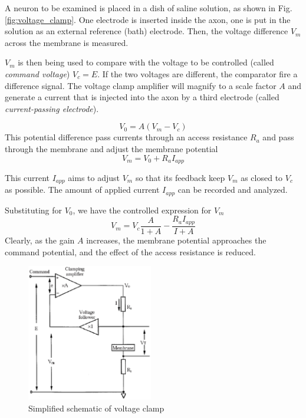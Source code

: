 A neuron to be examined is placed in a dish of saline solution, as
shown in Fig. \ref{fig:voltage_clamp}. One electrode is inserted
inside the axon, one is put in the solution as an external reference
(bath) electrode. Then, the voltage difference $V_m$ across the
membrane is measured.

$V_m$ is then being used to compare with the voltage to be controlled
(called {\it command voltage}) $V_c=E$. If the two voltages are
different, the comparator fire a difference signal.
The voltage clamp
amplifier will magnify to a scale factor $A$ and generate a current
that is injected into the axon by a third electrode (called
{\it current-passing electrode}).

\begin{equation}
  \label{eq:159}
  V_0 = A(V_m-V_c)
\end{equation}
This potential difference pass currents through an access resistance
$R_a$ and pass through the membrane and adjust the membrane potential
\begin{equation}
  \label{eq:160}
  V_m = V_0 + R_aI_{app}
\end{equation}

This current $I_{app}$ aims to adjust $V_m$ so that its feedback keep
$V_m$ as closed to $V_c$ as possible.  The amount of applied current
$I_{app}$ can be recorded and analyzed.

Substituting for $V_0$, we have the controlled expression for $V_m$
\begin{equation}
  \label{eq:161}
  V_m = V_c\frac{A}{1+A} -\frac{R_aI_{app}}{I+A}
\end{equation}
Clearly, as the gain $A$ increases, the membrane potential approaches
the command potential, and the effect of the access resistance is reduced.



\begin{figure}[htb]
  \centerline{\includegraphics[height=6cm]{./images/voltage_clamp_schematic.eps}}
  \caption{Simplified schematic of voltage
    clamp}\label{fig:voltage_clamp_schematic}
\end{figure}

